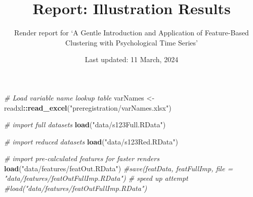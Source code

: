 \documentclass[
]{article}
\title{Report: Illustration Results}
\subtitle{Render report for `A Gentle Introduction and Application of
Feature-Based Clustering with Psychological Time Series'}
\author{}
\date{\vspace{-2.5em}Last updated: 11 March, 2024}
\newenvironment{Shaded}{\begin{snugshade}}{\end{snugshade}}
\newcommand{\CommentTok}[1]{\textcolor[rgb]{0.56,0.35,0.01}{\textit{#1}}}
\newcommand{\FunctionTok}[1]{\textcolor[rgb]{0.13,0.29,0.53}{\textbf{#1}}}
\newcommand{\NormalTok}[1]{#1}
\newcommand{\OtherTok}[1]{\textcolor[rgb]{0.56,0.35,0.01}{#1}}
\newcommand{\SpecialCharTok}[1]{\textcolor[rgb]{0.81,0.36,0.00}{\textbf{#1}}}
\newcommand{\StringTok}[1]{\textcolor[rgb]{0.31,0.60,0.02}{#1}}
\begin{document}
\maketitle

\begin{Shaded}
\begin{Highlighting}[]
\CommentTok{\# Load variable name lookup table}
\NormalTok{varNames }\OtherTok{\textless{}{-}}\NormalTok{ readxl}\SpecialCharTok{::}\FunctionTok{read\_excel}\NormalTok{(}\StringTok{"preregistration/varNames.xlsx"}\NormalTok{)}

\CommentTok{\# import full datasets}
\FunctionTok{load}\NormalTok{(}\StringTok{"data/s123Full.RData"}\NormalTok{)}

\CommentTok{\# import reduced datasets}
\FunctionTok{load}\NormalTok{(}\StringTok{"data/s123Red.RData"}\NormalTok{)}

\CommentTok{\# import pre{-}calculated features for faster renders}
\FunctionTok{load}\NormalTok{(}\StringTok{"data/features/featOut.RData"}\NormalTok{)}
\CommentTok{\#save(featData, featFullImp, file = "data/features/featOutFullImp.RData") \# speed up attempt }
\CommentTok{\#load("data/features/featOutFullImp.RData")}
\end{Highlighting}
\end{Shaded}
\end{document}
